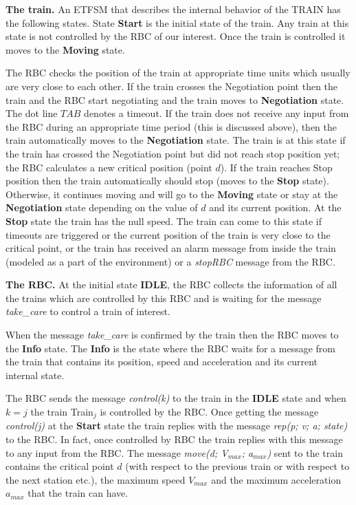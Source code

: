 \documentclass{template/openetcs_article}
\begin{document}
\noindent\textbf{The train.} An ETFSM that describes the internal behavior of the TRAIN has the following states. State \textbf{Start} is the initial state of the train. Any train at this state is not controlled by the RBC of our interest. Once the train is controlled it moves to the \textbf{Moving} state.

The RBC checks the position of the train at appropriate time units which usually are very close to each other. If the train crosses the Negotiation point then the train and the RBC start negotiating and the train moves to \textbf{Negotiation} state. The dot line $TAB$ denotes a timeout. If the train does not receive any input from the RBC during an appropriate time period (this is discussed above), then the train automatically moves to the \textbf{Negotiation} state.  The train is at this state if the train has crossed the Negotiation point but did not reach stop position yet; the RBC calculates a new critical position (point $d$).  If the train reaches Stop position then the train automatically should stop (moves to the \textbf{Stop} state). Otherwise, it continues moving and will go to the \textbf{Moving} state or stay at the \textbf{Negotiation} state depending on the value of $d$ and its current position. At the \textbf{Stop} state the train has the null speed. The train can come to this state if timeouts are triggered or the current position of the train is very close to the critical point, or the train has received an alarm message from inside the train (modeled as a part of the environment) or a \textit{stopRBC} message from the RBC.

\noindent\textbf{The RBC.} At the initial state \textbf{IDLE}, the RBC collects the information of all the trains which are controlled by this RBC and is waiting for the message \textit{take\_care} to control a train of interest.
 
When the message \textit{take\_care} is confirmed by the train then the RBC moves to the \textbf{Info} state. The \textbf{Info} is the state where the RBC waits for a message from the train that contains its position, speed and acceleration and its current internal state. 

The RBC sends the message \textit{control(k)} to the train in the \textbf{IDLE} state and when $k = j$ the train Train$_j$ is controlled by the RBC. Once getting the message \textit{control(j)} at the \textbf{Start} state the train replies with the message \textit{rep(p; v; a; state)} to the RBC. In fact, once controlled by RBC the train replies with this message to any input from the RBC. The message \textit{move(d; V$_{max}$; a$_{max}$)} sent to the train contains the critical point $d$ (with respect to the previous train or with respect to the next station etc.), the maximum speed $V_{max}$ and the maximum acceleration $a_{max}$ that the train can have. 
\end{document}
